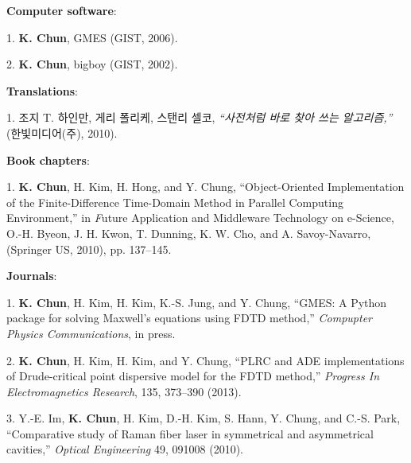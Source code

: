 \documentclass{gist}
\begin{document}
\begin{publication}{2cm}

\item[]\hspace{-\labelwidth}\hspace{-\labelsep}\textbf{Computer software}:
\item[1.] \textbf{K. Chun}, GMES (GIST, 2006).
\item[2.] \textbf{K. Chun}, bigboy (GIST, 2002).

\item[]\hspace{-\labelwidth}\hspace{-\labelsep}\textbf{Translations}:
\item[1.] 조지 T. 하인만, 게리 폴리케, 스탠리 셀코, \textit{``사전처럼 바로 찾아 쓰는 알고리즘,''} (한빛미디어(주), 2010).

\item[]\hspace{-\labelwidth}\hspace{-\labelsep}\textbf{Book chapters}:
\item[1.] \textbf{K. Chun}, H. Kim, H. Hong, and Y. Chung, ``Object-Oriented Implementation of the Finite-Difference Time-Domain Method in Parallel Computing Environment,'' in {\textit Future Application and Middleware Technology on e-Science,} O.-H. Byeon, J. H. Kwon, T. Dunning, K. W. Cho, and A. Savoy-Navarro, (Springer US, 2010), pp. 137–145.

\item[]\hspace{-\labelwidth}\hspace{-\labelsep}\textbf{Journals}:
\item[1.] \textbf{K. Chun}, H. Kim, H. Kim, K.-S. Jung, and Y. Chung, ``GMES: A Python package for solving Maxwell's equations using FDTD method,'' \textit{Compupter Physics Communications}, in press.
\item[2.] \textbf{K. Chun}, H. Kim, H. Kim, and Y. Chung, ``PLRC and ADE implementations of Drude-critical point dispersive model for the FDTD method,'' \textit{Progress In Electromagnetics Research}, 135, 373–390 (2013).
\item[3.] Y.-E. Im, \textbf{K. Chun}, H. Kim, D.-H. Kim, S. Hann, Y. Chung, and C.-S. Park, ``Comparative study of Raman fiber laser in symmetrical and asymmetrical cavities,'' \textit{Optical Engineering} 49, 091008 (2010).


\end{publication}
\end{document}
